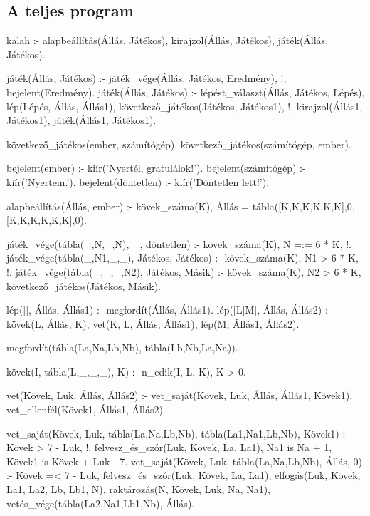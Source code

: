 \subsection*{A teljes program}
\begin{program}

kalah :-
    alapbeállítás(Állás, Játékos),
    kirajzol(Állás, Játékos),
    játék(Állás, Játékos).

játék(Állás, Játékos) :-
    játék_vége(Állás, Játékos, Eredmény), !,
    bejelent(Eredmény).
játék(Állás, Játékos) :-
    lépést_választ(Állás, Játékos, Lépés),
    lép(Lépés, Állás, Állás1),
    következő_játékos(Játékos, Játékos1), !,
    kirajzol(Állás1, Játékos1),
    játék(Állás1, Játékos1).

következő_játékos(ember, számítógép).
következő_játékos(számítógép, ember).

bejelent(ember) :- kiír('Nyertél, gratulálok!').
bejelent(számítógép) :- kiír('Nyertem.').
bejelent(döntetlen) :- kiír('Döntetlen lett!').


alapbeállítás(Állás, ember) :-
    kövek_száma(K),
    Állás = tábla([K,K,K,K,K,K],0,
                  [K,K,K,K,K,K],0).


játék_vége(tábla(_,N,_,N), _, döntetlen) :-
    kövek_száma(K), N =:= 6 * K, !.
játék_vége(tábla(_,N1,_,_), Játékos, Játékos) :-
    kövek_száma(K), N1 > 6 * K, !.
játék_vége(tábla(_,_,_,N2), Játékos, Másik) :-
    kövek_száma(K), N2 > 6 * K,
    következő_játékos(Játékos, Másik).

lép([], Állás, Állás1) :- megfordít(Állás, Állás1).
lép([L|M], Állás, Állás2) :-
    kövek(L, Állás, K),
    vet(K, L, Állás, Állás1),
    lép(M, Állás1, Állás2).

megfordít(tábla(La,Na,Lb,Nb), tábla(Lb,Nb,La,Na)).

kövek(I, tábla(L,_,_,_), K) :-
    n_edik(I, L, K), K > 0.

vet(Kövek, Luk, Állás, Állás2) :-
    vet_saját(Kövek, Luk, Állás, Állás1, Kövek1),
    vet_ellenfél(Kövek1, Állás1, Állás2).

vet_saját(Kövek, Luk, tábla(La,Na,Lb,Nb),
          tábla(La1,Na1,Lb,Nb), Kövek1) :-
    Kövek > 7 - Luk, !, %
    felvesz_és_szór(Luk, Kövek, La, La1),
    Na1 is Na + 1, Kövek1 is Kövek + Luk - 7.
vet_saját(Kövek, Luk,
          tábla(La,Na,Lb,Nb), Állás, 0) :-
    Kövek =< 7 - Luk,
    felvesz_és_szór(Luk, Kövek, La, La1),
    elfogás(Luk, Kövek, La1, La2, Lb, Lb1, N),
    raktározás(N, Kövek, Luk, Na, Na1),
    vetés_vége(tábla(La2,Na1,Lb1,Nb), Állás).


\end{program}
